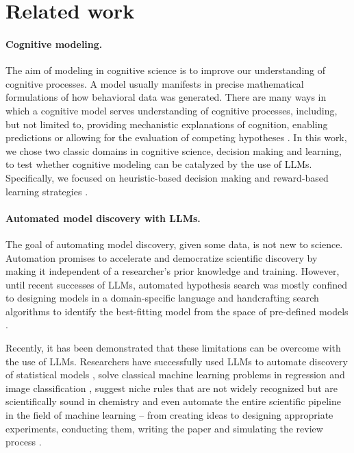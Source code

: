\section{Related work}
\paragraph{Cognitive modeling.}
The aim of modeling in cognitive science is to improve our understanding of cognitive processes. A model usually manifests in precise mathematical formulations of how behavioral data was generated. There are many ways in which a cognitive model serves understanding of cognitive processes, including, but not limited to, providing mechanistic explanations of cognition, enabling predictions or allowing for the evaluation of competing hypotheses  \cite{wilson2019ten}. In this work, we chose two classic domains in cognitive science, decision making and learning, to test whether cognitive modeling can be catalyzed by the use of LLMs. Specifically, we focused on heuristic-based decision making and reward-based learning strategies \cite{gigerenzer1996reasoning, frank2004carrot, pessiglione2006dopamine, wang2016learning, binz2022heuristics}.

\paragraph{Automated model discovery with LLMs.}
The goal of automating model discovery, given some data, is not new to science. Automation promises to accelerate and democratize scientific discovery by making it independent of a researcher's prior knowledge and training. However, until recent successes of LLMs, automated hypothesis search was mostly confined to designing models in a domain-specific language and handcrafting search algorithms to identify the best-fitting model from the space of pre-defined models \cite{kemp2008discovery,lloyd2014automatic,musslick2024automatingpracticescience, gulwani2011automating, steinruecken2019automatic,hewson2023bayesian}. 

Recently, it has been demonstrated that these limitations can be overcome with the use of LLMs. Researchers have successfully used LLMs to automate discovery of statistical models \cite{li2024automated}, solve classical machine learning problems in regression and image classification \cite{xiao2024verbalized}, suggest niche rules that are not widely recognized but are scientifically sound in chemistry \cite{zheng2023large} and even automate the entire scientific pipeline in the field of machine learning -- from creating ideas to designing appropriate experiments, conducting them, writing the paper and simulating the review process \cite{lu2024ai}.

